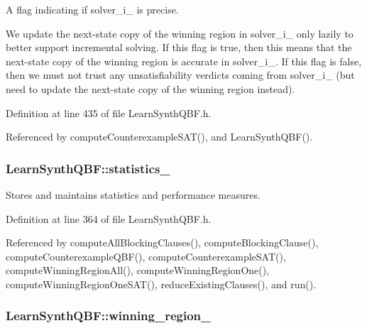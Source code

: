 A flag indicating if solver\-\_\-i\-\_\- is precise. 

We update the next-\/state copy of the winning region in solver\-\_\-i\-\_\- only lazily to better support incremental solving. If this flag is true, then this means that the next-\/state copy of the winning region is accurate in solver\-\_\-i\-\_\-. If this flag is false, then we must not trust any unsatisfiability verdicts coming from solver\-\_\-i\-\_\- (but need to update the next-\/state copy of the winning region instead). 

Definition at line 435 of file Learn\-Synth\-Q\-B\-F.\-h.



Referenced by compute\-Counterexample\-S\-A\-T(), and Learn\-Synth\-Q\-B\-F().

\hypertarget{classLearnSynthQBF_a85c46943042fdcfd672ce2251ef49cd9}{
\subsubsection[{statistics\-\_\-}]{ Learn\-Synth\-Q\-B\-F\-::statistics\-\_\-\hspace{0.3cm}{\ttfamily [protected]}}}\label{classLearnSynthQBF_a85c46943042fdcfd672ce2251ef49cd9}


Stores and maintains statistics and performance measures. 



Definition at line 364 of file Learn\-Synth\-Q\-B\-F.\-h.



Referenced by compute\-All\-Blocking\-Clauses(), compute\-Blocking\-Clause(), compute\-Counterexample\-Q\-B\-F(), compute\-Counterexample\-S\-A\-T(), compute\-Winning\-Region\-All(), compute\-Winning\-Region\-One(), compute\-Winning\-Region\-One\-S\-A\-T(), reduce\-Existing\-Clauses(), and run().

\hypertarget{classLearnSynthQBF_a9c6b41f7df5f4ed4bfc5930136fc1152}{
\subsubsection[{winning\-\_\-region\-\_\-}]{ Learn\-Synth\-Q\-B\-F\-::winning\-\_\-region\-\_\-\hspace{0.3cm}{\ttfamily [protected]}}}\label{classLearnSynthQBF_a9c6b41f7df5f4ed4bfc5930136fc1152}


